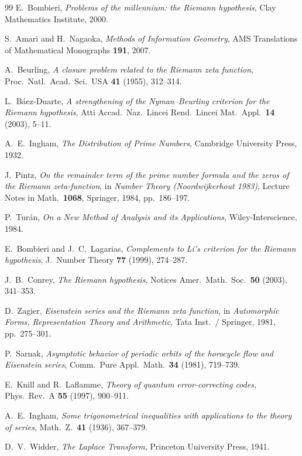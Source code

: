 \documentclass[12pt]{amsart}
\numberwithin{equation}{section}
\theoremstyle{definition}
\begin{document}
\begin{thebibliography}{99}
 E.~Bombieri,
\textit{Problems of the millennium: the Riemann hypothesis},
Clay Mathematics Institute, 2000.

 S.~Amari and H.~Nagaoka,
\textit{Methods of Information Geometry},
AMS Translations of Mathematical Monographs \textbf{191}, 2007.

 A.~Beurling,
\textit{A closure problem related to the Riemann zeta function},
Proc.\ Natl.\ Acad.\ Sci.\ USA \textbf{41} (1955), 312--314.

 L.~B\'aez-Duarte,
\textit{A strengthening of the Nyman--Beurling criterion for the Riemann hypothesis},
Atti Accad.\ Naz.\ Lincei Rend.\ Lincei Mat.\ Appl.\ \textbf{14} (2003), 5--11.

 A.~E.~Ingham,
\textit{The Distribution of Prime Numbers},
Cambridge University Press, 1932.

 J.~Pintz,
\textit{On the remainder term of the prime number formula and the zeros of
the Riemann zeta-function},
in \textit{Number Theory (Noordwijkerhout 1983)},
Lecture Notes in Math.\ \textbf{1068}, Springer, 1984, pp.\ 186--197.

 P.~Tur\'an,
\textit{On a New Method of Analysis and its Applications},
Wiley-Interscience, 1984.

 E.~Bombieri and J.~C.~Lagarias,
\textit{Complements to Li's criterion for the Riemann hypothesis},
J.\ Number Theory \textbf{77} (1999), 274--287.

 J.~B.~Conrey,
\textit{The Riemann hypothesis},
Notices Amer.\ Math.\ Soc.\ \textbf{50} (2003), 341--353.

 D.~Zagier,
\textit{Eisenstein series and the Riemann zeta function},
in \textit{Automorphic Forms, Representation Theory and Arithmetic},
Tata Inst.\ / Springer, 1981, pp.\ 275--301.

 P.~Sarnak,
\textit{Asymptotic behavior of periodic orbits of the horocycle flow and
Eisenstein series},
Comm.\ Pure Appl.\ Math.\ \textbf{34} (1981), 719--739.

 E.~Knill and R.~Laflamme,
\textit{Theory of quantum error-correcting codes},
Phys.\ Rev.\ A \textbf{55} (1997), 900--911.

 A.~E.~Ingham,
\textit{Some trigonometrical inequalities with applications to the theory of
series},
Math.\ Z.\ \textbf{41} (1936), 367--379.

 D.~V.~Widder,
\textit{The Laplace Transform},
Princeton University Press, 1941.

\end{thebibliography}
\end{document}
